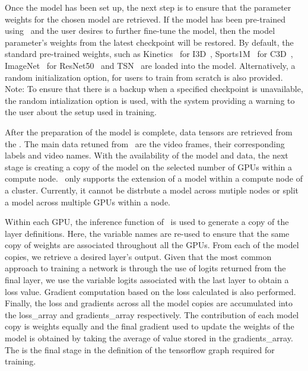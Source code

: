 \documentclass{llncs}
\begin{document}
Once the model has been set up, the next step is to ensure that the parameter weights for the chosen model are retrieved. 
If the model has been pre-trained using \acro~and the user desires to further fine-tune the model, then the model parameter's weights from the latest checkpoint will be restored.
By default, the standard pre-trained weights, such as Kinetics~\cite{} for I3D~\cite{}, Sports1M~\cite{} for C3D~\cite{}, ImageNet~\cite{} for ResNet50~\cite{} and TSN~\cite{} are loaded into the model.
Alternatively, a random initialization option, for users to train from scratch is also provided. \\
Note: To ensure that there is a backup when a specified checkpoint is unavailable, the random intialization option is used, with the system providing a warning to the user about the setup used in training.

After the preparation of the model is complete, data tensors are retrieved from the \data.
The main data retuned from \data~are the video frames, their corresponding labels and video names.
With the availability of the model and data, the next stage is creating a copy of the model on the selected number of GPUs within a compute node.
\acro~only supports the extension of a model within a compute node of a cluster. 
Currently, it cannot be distrbute a model across mutiple nodes or split a model across multiple GPUs within a node.

Within each GPU, the inference function of \model~is used to generate a copy of the layer definitions. 
Here, the variable names are re-used to ensure that the same copy of weights are associated throughout all the GPUs.
From each of the model copies, we retrieve a desired layer's output. 
Given that the most common approach to training a network is through the use of logits returned from the final layer, we use the variable logits associated with the last layer to obtain a loss value.
Gradient computation based on the loss calculated is also performed.
Finally, the loss and gradients across all the model copies are accumulated into the loss\_array and gradients\_array respectively.
The contribution of each model copy is weights equally and the final gradient used to update the weights of the model is obtained by taking the average of value stored in the gradients\_array.
The is the final stage in the definition of the tensorflow graph required for training.
\end{document}
